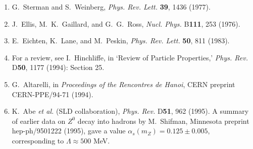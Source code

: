 \begin{enumerate}
  \item {}\label{ch18-ref-21}
  G.~Sterman and S.~Weinberg, \textit{Phys. Rev. Lett.} \textbf{39}, 1436 (1977).

  \item {}\label{ch18-ref-22}
  J.~Ellis, M.~K.~Gaillard, and G.~G.~Ross, \textit{Nucl. Phys.} B\textbf{111}, 253 (1976).

  \item {}\label{ch18-ref-23}
  E.~Eichten, K.~Lane, and M.~Peskin, \textit{Phys. Rev. Lett.} \textbf{50}, 811 (1983).

  \item {}\label{ch18-ref-24}
  For a review, see I.~Hinchliffe, in `Review of Particle Properties,' \textit{Phys. Rev.} D\textbf{50}, 1177 (1994): Section 25.

  \item {}\label{ch18-ref-25}
  G.~Altarelli, in \textit{Proceedings of the Rencontres de Hanoi}, CERN preprint CERN-PPE/94-71 (1994).

  \item {}\label{ch18-ref-26}
  K.~Abe \textit{et al.} (SLD collaboration), \textit{Phys. Rev.} D\textbf{51}, 962 (1995). A summary of earlier data on $Z^0$ decay into hadrons by M.~Shifman, Minnesota preprint hep-ph/9501222 (1995), gave a value $\alpha_s(m_Z)=0.125\pm0.005$, corresponding to $\Lambda\approx500$ MeV.
\end{enumerate}
